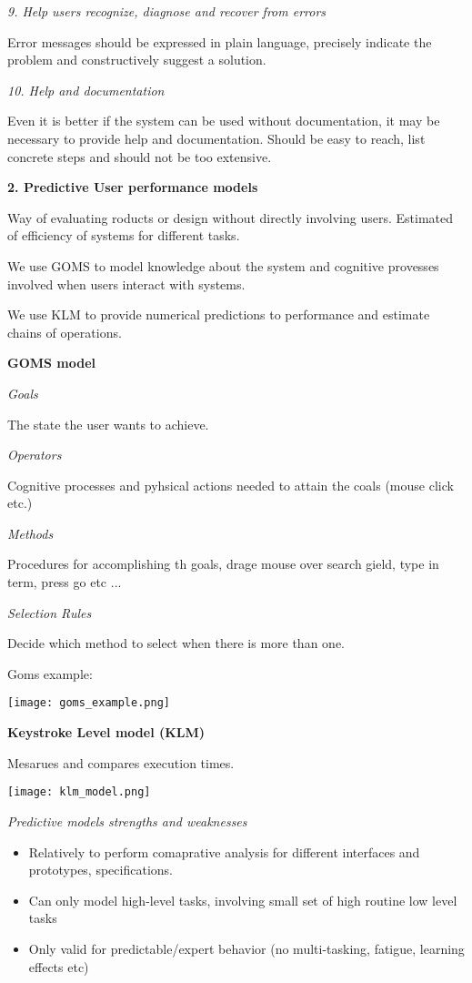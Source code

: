 \textit{9. Help users recognize, diagnose and recover from errors} \smallskip

Error messages should be expressed in plain language, precisely indicate the problem and constructively suggest a solution.

\textit{10. Help and documentation} \smallskip

Even it is better if the system can be used without documentation, it may be necessary to provide help and documentation. Should be easy to reach, list concrete steps and should not be too extensive. \medskip


\textbf{2. Predictive User performance models} \smallskip

Way of evaluating roducts or design without directly involving users. Estimated of efficiency of systems for different tasks. \smallskip

We use GOMS to model knowledge about the system and cognitive provesses involved when users interact with systems. 

We use KLM to provide numerical predictions to performance and estimate chains of operations. \medskip

\textbf{GOMS model} \smallskip

\textit{Goals} \smallskip

The state the user wants to achieve. \medskip

\textit{Operators} \smallskip

Cognitive processes and pyhsical actions needed to attain the coals (mouse click etc.) \medskip

\textit{Methods} \smallskip

Procedures for accomplishing th goals, drage mouse over search gield, type in term, press go etc ... \medskip

\textit{Selection Rules} \smallskip

Decide which method to select when there is more than one. \smallskip

Goms example:
\begin{center}
	\texttt{[image: goms\_example.png]}
\end{center}

\textbf{Keystroke Level model (KLM)} \smallskip

Mesarues and compares execution times. 

\begin{center}
	\texttt{[image: klm\_model.png]}
\end{center}


\textit{Predictive models strengths and weaknesses} \medskip


\begin{itemize}
    \item Relatively to perform comaprative analysis for different interfaces and prototypes, specifications. 
    \item Can only model high-level tasks, involving small set of high routine low level tasks
    \item Only valid for predictable/expert behavior (no multi-tasking, fatigue, learning effects etc)
\end{itemize}



